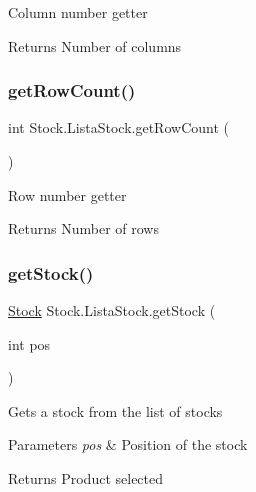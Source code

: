 Column number getter \begin{DoxyReturn}{Returns}
Number of columns 
\end{DoxyReturn}
\mbox{\label{class_stock_1_1_lista_stock_a52c69465417c81534f1433dc56f749d9}} 
\subsubsection{\texorpdfstring{get\+Row\+Count()}{getRowCount()}}
{\footnotesize\ttfamily int Stock.\+Lista\+Stock.\+get\+Row\+Count (\begin{DoxyParamCaption}{ }\end{DoxyParamCaption})\hspace{0.3cm}{\ttfamily [inline]}}

Row number getter \begin{DoxyReturn}{Returns}
Number of rows 
\end{DoxyReturn}
\mbox{\label{class_stock_1_1_lista_stock_a17681900b9bdf6909a15c61b4946d080}} 
\subsubsection{\texorpdfstring{get\+Stock()}{getStock()}}
{\footnotesize\ttfamily \mbox{\hyperlink{class_stock_1_1_stock}{Stock}} Stock.\+Lista\+Stock.\+get\+Stock (\begin{DoxyParamCaption}\item[{int}]{pos }\end{DoxyParamCaption})\hspace{0.3cm}{\ttfamily [inline]}}

Gets a stock from the list of stocks 
\begin{DoxyParams}{Parameters}
{\em pos} & Position of the stock \\
\hline
\end{DoxyParams}
\begin{DoxyReturn}{Returns}
Product selected 
\end{DoxyReturn}
\mbox{\label{class_stock_1_1_lista_stock_ac181755caf0025ec10ae230927bb457f}} 
